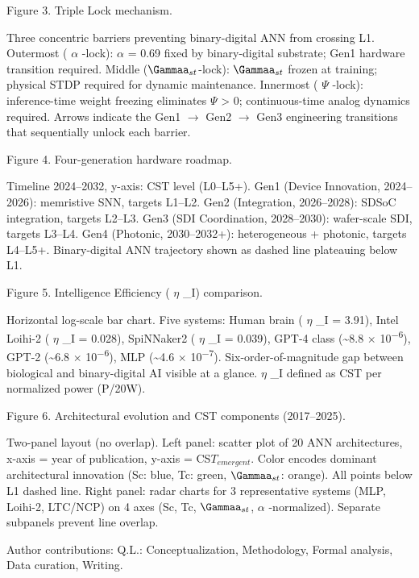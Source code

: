 \documentclass[a4paper,12pt]{article}
\begin{document}
Figure 3. Triple Lock mechanism.

Three concentric barriers preventing binary-digital ANN from crossing L1.
Outermost ( $\alpha$ -lock):  $\alpha$  = 0.69 fixed by binary-digital substrate; Gen1 hardware transition required.
Middle ($\Gammaa_{st}$-lock): $\Gammaa_{st}$ frozen at training; physical STDP required for dynamic maintenance.
Innermost ( $\Psi$ -lock): inference-time weight freezing eliminates  $\Psi$  > 0; continuous-time analog dynamics required.
Arrows indicate the Gen1 $\rightarrow$ Gen2 $\rightarrow$ Gen3 engineering transitions that sequentially unlock each barrier.

Figure 4. Four-generation hardware roadmap.

Timeline 2024--2032, y-axis: CST level (L0--L5+). Gen1 (Device Innovation, 2024--2026): memristive SNN, targets L1--L2. Gen2 (Integration, 2026--2028): SDSoC integration, targets L2--L3. Gen3 (SDI Coordination, 2028--2030): wafer-scale SDI, targets L3--L4. Gen4 (Photonic, 2030--2032+): heterogeneous + photonic, targets L4--L5+. Binary-digital ANN trajectory shown as dashed line plateauing below L1.

Figure 5. Intelligence Efficiency ( $\eta$ \_I) comparison.

Horizontal log-scale bar chart. Five systems: Human brain ( $\eta$ \_I = 3.91), Intel Loihi-2 ( $\eta$ \_I = 0.028), SpiNNaker2 ( $\eta$ \_I = 0.039), GPT-4 class (\textasciitilde{}8.8 $\times$ 10\textsuperscript{$-$}\textsuperscript{6}), GPT-2 (\textasciitilde{}6.8 $\times$ 10\textsuperscript{$-$}\textsuperscript{6}), MLP (\textasciitilde{}4.6 $\times$ 10\textsuperscript{$-$}\textsuperscript{7}). Six-order-of-magnitude gap between biological and binary-digital AI visible at a glance.  $\eta$ \_I defined as CST per normalized power (P/20W).

Figure 6. Architectural evolution and CST components (2017--2025).

Two-panel layout (no overlap). Left panel: scatter plot of 20 ANN architectures, x-axis = year of publication, y-axis = CS$T_{emergent}$. Color encodes dominant architectural innovation (Sc: blue, Tc: green, $\Gammaa_{st}$: orange). All points below L1 dashed line. Right panel: radar charts for 3 representative systems (MLP, Loihi-2, LTC/NCP) on 4 axes (Sc, Tc, $\Gammaa_{st}$,  $\alpha$ -normalized). Separate subpanels prevent line overlap.

Author contributions: Q.L.: Conceptualization, Methodology, Formal analysis, Data curation, Writing.
\end{document}
